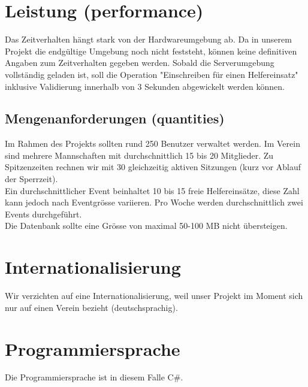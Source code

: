 	\section{Leistung (performance)}
	Das Zeitverhalten hängt stark von der Hardwareumgebung ab. Da in unserem Projekt die endgültige Umgebung noch nicht feststeht, können keine definitiven Angaben zum Zeitverhalten gegeben werden. Sobald die Serverumgebung vollständig geladen ist, soll die Operation "Einschreiben für einen Helfereinsatz" inklusive Validierung innerhalb von 3 Sekunden abgewickelt werden können.

	\subsection{Mengenanforderungen (quantities)}
	Im Rahmen des Projekts sollten rund 250 Benutzer verwaltet werden. Im Verein sind mehrere Mannschaften mit durchschnittlich 15 bis 20 Mitglieder. 
	Zu Spitzenzeiten rechnen wir mit 30 gleichzeitig aktiven Sitzungen (kurz vor Ablauf der Sperrzeit). \\Ein durchschnittlicher Event beinhaltet 10 bis 15 freie Helfereinsätze, diese Zahl kann jedoch nach Eventgrösse variieren. Pro Woche werden durchschnittlich zwei Events durchgeführt.
	\\Die Datenbank sollte eine Grösse von maximal 50-100 MB nicht übersteigen.
	
	
	\section{Internationalisierung}
	Wir verzichten auf eine Internationalisierung, weil unser Projekt im Moment sich nur auf einen Verein bezieht (deutschsprachig).
	
	\section{Programmiersprache}
	Die Programmiersprache ist in diesem Falle C\#.

	
